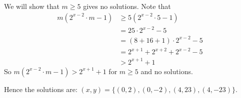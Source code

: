\documentclass[problems.tex]{subfile}
\begin{document}
\begin{solution}
\begin{enumerate}
			We will show that $m \ge 5$ gives no solutions. Note that
			\begin{align*}
				m(2^{x - 2} \cdot m - 1)
					& \ge 5(2^{x - 2} \cdot 5 - 1) \\
					& = 25 \cdot 2^{x - 2} - 5 \\
					& = (8 + 16 + 1) \cdot 2^{x - 2} - 5  \\
					& = 2^{x + 1} + 2^{x + 2} + 2^{x - 2} - 5 \\
					& > 2^{x + 1} + 1
			\end{align*}
			So $m(2^{x - 2} \cdot m - 1) > 2^{x + 1} + 1$ for $m \ge 5$ and no solutions.
		\end{enumerate}
		Hence the solutions are: $(x,  y) = \{(0,  2), (0, -2), (4,  23),  (4, -23)\}$.
	\end{solution}

%
\end{document}
